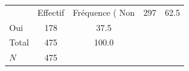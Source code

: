 {
\def\sym#1{\ifmmode^{#1}\else\(^{#1}\)\fi}
\begin{tabular}{l*{1}{cc}}
\toprule
            &    Effectif&Fréquence (%
\midrule
Non         &         297&        62.5\\
Oui         &         178&        37.5\\
Total       &         475&       100.0\\
\midrule
\(N\)       &         475&            \\
\bottomrule
\end{tabular}
}
